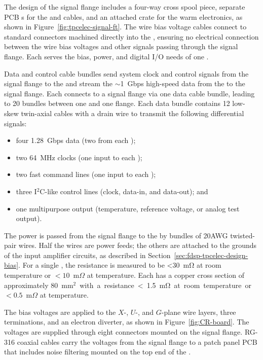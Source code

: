 The design of the signal flange includes a four-way cross spool piece, separate PCB \fdth{}s for the  and  cables, and
an attached crate for the  warm electronics, as shown in Figure~\ref{fig:tpcelec-signal-ft}.
The wire bias voltage cables connect to standard  connectors machined directly into the  \fdth,
ensuring no electrical connection between the wire bias voltages and other signals passing through the signal flange.
Each  \fdth serves the bias, power, and digital I/O needs of one .  

Data and control cable bundles send system clock and control signals from the 
signal flange to the  and stream the $\sim$\SI{1}{Gbps} high-speed data from the  to the signal flange.  Each  
connects to a signal flange via one data cable bundle, leading to 20 bundles between one  and one flange.  Each data bundle contains 12 low-skew twin-axial cables with a drain wire 
to transmit the following differential signals:
\begin{itemize}
    \item four \SI{1.28}{Gbps} data (two from each );
    \item two \SI{64}{MHz} clocks (one input to each );
    \item two fast command lines (one input to each );
    \item three I$^2$C-like control lines (clock, data-in, and data-out); and
    \item one multipurpose  output (temperature, reference voltage, or analog test output).
\end{itemize}

The  power is passed from the signal flange to the  by bundles of
20AWG twisted-pair wires. Half the wires are power feeds; the others
are attached to the grounds of the input amplifier circuits, as described in Section~\ref{sec:fdsp-tpcelec-design-bias}.
For a single , the resistance is measured to be  <\SI{30}{\milli\ohm} at room temperature or $<10$~m$\Omega$ at 
 temperature. Each  has a copper cross section of approximately %
\SI{80}{mm$^2$} with a 
resistance <\SI{1.5}{\milli\ohm} at room temperature or $<0.5$~m$\Omega$ at  temperature.

The bias voltages are applied to the $X$-, $U$-, and $G$-plane wire layers, three  terminations, 
and an electron diverter, as shown in Figure~\ref{fig:CR-board}. The voltages are supplied 
through eight  connectors mounted on the signal flange. RG-316 coaxial cables carry the voltages 
from the signal flange to a patch panel PCB that includes noise filtering mounted on the top 
end of the . 

